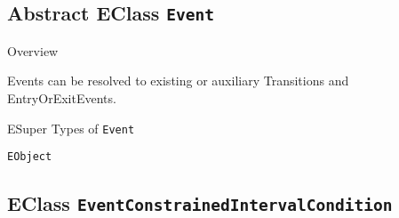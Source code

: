 \subsection{Abstract EClass \bfseries \texttt{Event}\normalfont}
\label{cls:dependencylanguage::Event} 
	
	\begin{longdescription}
		\item[Overview] 		
				

	

		Events can be resolved to existing or auxiliary Transitions and EntryOrExitEvents.		
		\item[ESuper Types of \texttt{Event}] ~
			\begin{longdescription}
				\item[\texttt{EObject}] 						\end{longdescription}
		
	
	
	\end{longdescription}
	

\subsection{EClass \bfseries \texttt{EventConstrainedIntervalCondition}\normalfont}
\label{cls:dependencylanguage::EventConstrainedIntervalCondition} 
	
